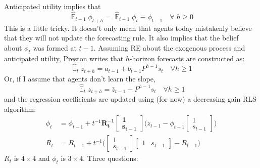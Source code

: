 \documentclass[11pt]{article}
\renewcommand{\[}{\begin{equation}}
\renewcommand{\]}{\end{equation}}
\DeclareMathOperator{\E}{\mathbb{E}}
\begin{document}
Anticipated utility implies that
\begin{equation}
\hat{\E}_{t-1}{\phi_{t+h}} = \hat{\E}_{t-1}{\phi_{t}} \equiv \phi_{t-1} \quad \forall \; h\geq0 
\end{equation}
This is a little tricky. It doesn't only mean that agents today mistakenly believe that they will not update the forecasting rule. It also implies that the belief about $\phi_t$ was formed at $t-1$.
Assuming RE about the exogenous process and anticipated utility, Preston writes that $h$-horizon forecasts are constructed as:
\begin{equation}
\hat{\E}_t z_{t+h} = a_{t-1} + b_{t-1}P^{h-1}s_t  \quad \forall h\geq 1 \label{PLM_fcst_general}
\end{equation}
Or, if I assume that agents don't learn the slope, 
\begin{equation}
\hat{\E}_t z_{t+h} = \bar{z}_{t-1} + P^{h-1}s_t  \quad \forall h\geq 1 \label{PLM_fcst}
\end{equation}
and the regression coefficients are updated using (for now) a decreasing gain RLS algorithm:
\begin{align}
\phi_t  & = \phi_{t-1} + t^{-1} \mathbf{R_t^{-1}}\begin{bmatrix} \mathbf{1} \\ \mathbf{s_{t-1}} \end{bmatrix}\bigg(z_{t-1} - \phi_{t-1} \begin{bmatrix} 1 \\ s_{t-1} \end{bmatrix} \bigg) \\
R_t &= R_{t-1} +  t^{-1} \bigg( \begin{bmatrix} 1 \\ s_{t-1} \end{bmatrix} \begin{bmatrix} 1 & s_{t-1} \end{bmatrix}  - R_{t-1} \bigg)
\end{align}
$R_t$ is $4\times 4$ and $\phi_t$ is $3 \times 4$. Three questions:
\end{document}
